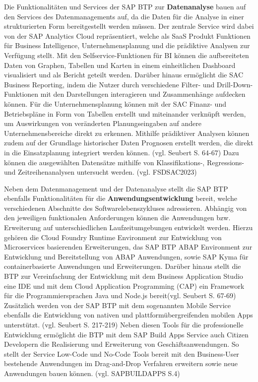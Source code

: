 Die Funktionalitäten und Services der SAP BTP zur \textbf{Datenanalyse} bauen auf den Services des Datenmanagements auf, da die Daten für die Analyse in einer strukturierten Form bereitgestellt werden müssen. Der zentrale Service wird dabei von der SAP Analytics Cloud repräsentiert, welche als SaaS Produkt Funktionen für Business Intelligence, Unternehmensplanung und die prädiktive Analysen zur Verfügung stellt. Mit den Selfservice-Funktionen für BI können die aufbereiteten Daten von Graphen, Tabellen und Karten in einem einheitlichen Dashboard visualisiert und als Bericht geteilt werden. Darüber hinaus ermöglicht die SAC Business Reporting, indem die Nutzer durch verschiedene Filter- und Drill-Down-Funktionen mit den Darstellungen interagieren und Zusammenhänge aufdecken können. Für die Unternehmensplanung können mit der SAC Finanz- und Betriebspläne in Form von Tabellen erstellt und miteinander verknüpft werden, um Auswirkungen von veränderten Planungseingaben auf andere Unternehmensbereiche direkt zu erkennen. Mithilfe prädiktiver Analysen können zudem auf der Grundlage historischer Daten Prognosen erstellt werden, die direkt in die Einsatzplanung integriert werden können. (vgl. Seubert S. 64-67) Dazu können die ausgewählten Datensätze mithilfe von Klassifikations-, Regressions- und Zeitreihenanalysen untersucht werden. (vgl. FSDSAC2023)

Neben dem Datenmanagement und der Datenanalyse stellt die SAP BTP ebenfalls Funktionalitäten für die \textbf{Anwendungsentwicklung} bereit, welche verschiedenen Abschnitte des Softwarelebenszykluses adressieren. Abhängig von den jeweiligen funktionalen Anforderungen können die Anwendungen bzw. Erweiterung auf unterschiedlichen Laufzeitumgebungen entwickelt werden. Hierzu gehören die Cloud Foundry Runtime Environment zur Entwicklung von Microservices basierenden Erweiterungen, das SAP BTP ABAP Environment zur Entwicklung und Bereitstellung von ABAP Anwendungen, sowie SAP Kyma für containerbasierte Anwendungen und Erweiterungen. Darüber hinaus stellt die BTP zur Vereinfachung der Entwicklung mit dem Business Application Studio eine IDE und mit dem Cloud Application Programming (CAP) ein Framework für die Programmiersprachen Java und Node.js bereit(vgl. Seubert S. 67-69) Zusätzlich werden von der SAP BTP mit dem sogenannten Mobile Service ebenfalls die Entwicklung von nativen und plattformübergreifenden mobilen Apps unterstützt. (vgl. Seubert S. 217-219) Neben diesen Tools für die professionelle Entwicklung ermöglicht die BTP mit dem SAP Build Apps Service auch Citizen Developern die Realisierung und Erweiterung von Geschäftsanwendungen. So stellt der Service Low-Code und No-Code Tools bereit mit den Business-User bestehende Anwendungen im Drag-and-Drop Verfahren erweitern sowie neue Anwendungen bauen können. (vgl. SAPBUILDAPPS S.4) 


